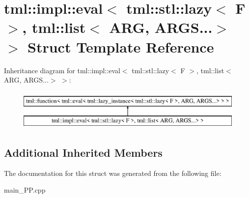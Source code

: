 \hypertarget{structtml_1_1impl_1_1eval_3_01tml_1_1stl_1_1lazy_3_01F_01_4_00_01tml_1_1list_3_01ARG_00_01ARGS_8_8_8_4_01_4}{\section{tml\+:\+:impl\+:\+:eval$<$ tml\+:\+:stl\+:\+:lazy$<$ F $>$, tml\+:\+:list$<$ A\+R\+G, A\+R\+G\+S...$>$ $>$ Struct Template Reference}
\label{structtml_1_1impl_1_1eval_3_01tml_1_1stl_1_1lazy_3_01F_01_4_00_01tml_1_1list_3_01ARG_00_01ARGS_8_8_8_4_01_4}
}
Inheritance diagram for tml\+:\+:impl\+:\+:eval$<$ tml\+:\+:stl\+:\+:lazy$<$ F $>$, tml\+:\+:list$<$ A\+R\+G, A\+R\+G\+S...$>$ $>$\+:\begin{figure}[H]
\begin{center}
\leavevmode
\includegraphics[height=2.000000cm]{structtml_1_1impl_1_1eval_3_01tml_1_1stl_1_1lazy_3_01F_01_4_00_01tml_1_1list_3_01ARG_00_01ARGS_8_8_8_4_01_4}
\end{center}
\end{figure}
\subsection*{Additional Inherited Members}


The documentation for this struct was generated from the following file\+:\begin{DoxyCompactItemize}
\item 
main\+\_\+\+P\+P.\+cpp\end{DoxyCompactItemize}
